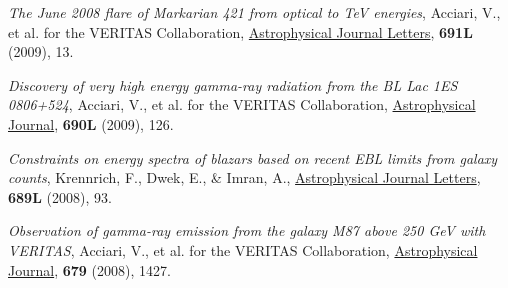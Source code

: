 \documentclass[9pt]{article}
\renewcommand{\section}[2]%
        {\pagebreak[2]\vspace{1.3\baselineskip}%
         \phantomsection\addcontentsline{toc}{section}{#1}%
         \hspace{0in}%
         \marginpar{
           \raggedright \scshape \bf \textcolor{superblue}{\large #1}}#2}
\newcommand{\blankline}{\quad\pagebreak[2]}
\begin{document}
{\blankline{}

\textit{The June 2008 flare of Markarian 421 from optical to TeV energies}, Acciari, V., et al. for the VERITAS Collaboration, \underline{Astrophysical Journal Letters}, \textbf{691L} (2009), 13.

\blankline{}


\textit{Discovery of very high energy gamma-ray radiation from the BL Lac 1ES 0806+524}, Acciari, V., et al. for the VERITAS Collaboration, \underline{Astrophysical Journal}, \textbf{690L} (2009), 126.

 \blankline{}

 \textit{Constraints on energy spectra of blazars based on recent EBL limits from galaxy counts}, Krennrich, F., Dwek, E., \& Imran, A., \underline{Astrophysical Journal Letters}, \textbf{689L} (2008), 93.



\blankline{}

 \textit{Observation of gamma-ray emission from the galaxy M87 above 250 GeV with VERITAS}, Acciari, V., et al. for the VERITAS Collaboration, \underline{Astrophysical Journal}, \textbf{679} (2008), 1427.

 \blankline{}






}
\end{document}
